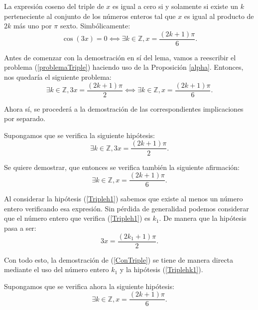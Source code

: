 \begin{lema}[SolucionCosenoTriple]\label{lemaCosenoTriple}
  La expresión coseno del
  triple de \(x\) es igual a cero si y solamente si
  existe un \(k\) perteneciente al conjunto de los números
  enteros tal que \(x\) es igual al producto de \(2k\) más
  uno por \(π\) sexto. Simbólicamente:
  \begin{equation}\label{problemaTriple}
    \cos(3x)=0 ⟺ ∃k ∈ ℤ,x=\frac{(2k+1)π}{6}.
  \end{equation}
\end{lema}
\begin{demostracion}
  Antes de comenzar con la demostración en sí del lema, vamos a
  reescribir el problema (\ref{problemaTriple}) haciendo uso de la
  Proposición \ref{alpha}. Entonces, nos quedaría el siguiente
  problema:
  \begin{equation}
    ∃k∈ ℤ,3x=\frac{(2k+1)π}{2}⟺ ∃k ∈ ℤ,x=\frac{(2k+1)π}{6}.
  \end{equation}

  Ahora sí, se procederá a la demostración de las correspondientes
  implicaciones por separado.

  \noindent
  \framebox{\longrightarrow}
  Supongamos que se verifica la siguiente hipótesis:
  \begin{equation}\label{Tripleh1}\tag{h1}
    ∃k∈ ℤ,3x=\frac{(2k+1)π}{2}.
  \end{equation}

  Se quiere demostrar, que entonces se verifica también la
  siguiente afirmación:
  \begin{equation}\label{ConTriple}
     ∃k ∈ ℤ,x=\frac{(2k+1)π}{6}.
   \end{equation}

   Al considerar la hipótesis (\ref{Tripleh1}) sabemos que existe
   al menos un número entero verificando esa expresión. Sin
   pérdida de generalidad podemos considerar que el número entero
   que verifica (\ref{Tripleh1}) es \(k_1\). De manera que la
   hipótesis pasa a ser:
   \begin{equation}\label{Triplehk1}\tag{hk1}
    3x=\frac{(2k_1+1)π}{2}.
  \end{equation}

  Con todo esto, la demostración de (\ref{ConTriple}) se tiene de
  manera directa mediante el uso del número
  entero \(k_1\) y la hipótesis (\ref{Triplehk1}).

   \noindent
   \framebox{\longleftarrow}
   Supongamos que se verifica ahora la siguiente hipótesis:
   \begin{equation}\label{Tripleh2}\tag{h2}
     ∃k ∈ ℤ,x=\frac{(2k+1)π}{6}.
  \end{equation}


\end{demostracion}
